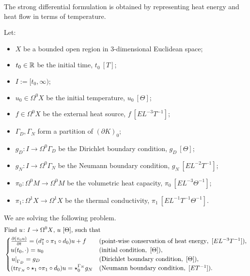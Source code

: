 \begin{formulation}
  \label{idec/continuous_heat_transport/strong-formulation}
  The strong differential formulation is obtained by representing heat energy
  and heat flow in terms of temperature.
  
  Let:
  \begin{itemize}
    \item
      $X$ be a bounded open region in $3$-dimensional Euclidean space;
    \item
      $t_0 \in \mathbb{R}$ be the initial time, $t_0\ [T]$;
    \item
      $I := [t_0, \infty)$;
    \item
      $u_0 \in \Omega^0 X$ be the initial temperature, $u_0\ [\Theta]$;
    \item
      $f \in \Omega^0 X$ be the external heat source, $f\ [E L^{-3} T^{-1}]$;
    \item
      $\Gamma_D, \Gamma_N$ form a partition of $(\partial K)_0$;
    \item
      $g_D \colon I \to \Omega^0 \Gamma_D$
      be the Dirichlet boundary condition, $g_D\ [\Theta]$;
    \item
      $g_N \colon I \to \Omega^0 \Gamma_N$
      be the Neumann boundary condition, $g_N\ [E L^{-2} T^{-1}]$;
    \item
      $\pi_0 \colon \Omega^0 M \to \Omega^0 M$ be the volumetric heat capacity,
      $\pi_0\ [E L^{-3} \Theta^{-1}]$;
    \item
      $\pi_1 \colon \Omega^1 X \to \Omega^1 X$ be the thermal conductivity,
      $\pi_1\ [E L^{-1} T^{-1} \Theta^{-1}]$.
  \end{itemize}
  We are solving the following problem.
  \begin{equation}
    \begin{split}
      & \text{Find $u \colon I \to \Omega^0 X$, $u\ [\Theta]$, such that} \\
      &
      \begin{cases}
        \frac{\partial (\pi_0 u)}{\partial t} =
        (d_1^\star \circ \pi_1 \circ d_0) u + f
        & (\text{point-wise conservation of heat energy},
          \ [E L^{-3} T^{-1}]), \\
%
        u(t_0, \cdot) = u_0
        & (\text{initial condition},\ [\Theta]), \\
%
        \restrict{u}{\Gamma_D} = g_D
        & (\text{Dirichlet boundary condition},\ [\Theta]), \\
%
        (\tr_{\Gamma_N} \circ \star_1\circ \pi_1 \circ d_0) u
        = \star^{\Gamma_N}_0 g_N
        & (\text{Neumann boundary condition},\ [E T^{-1}]).
      \end{cases}
    \end{split}
  \end{equation}
\end{formulation}
